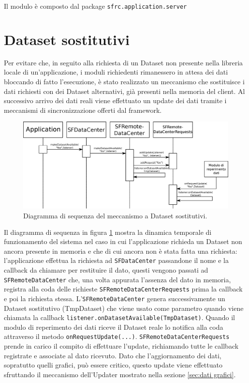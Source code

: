 Il modulo \`e composto dal package \texttt{sfrc.application.server}

\section{Dataset sostitutivi}
\label{sec:dataset_sost}
Per evitare che, in seguito alla richiesta di un Dataset non presente nella libreria locale di un'applicazione, i moduli richiedenti rimanessero in attesa dei dati bloccando di fatto l'esecuzione, \`e stato realizzato un meccanismo che sostituisce i dati richiesti con dei Dataset alternativi, gi\`a presenti nella memoria del client. Al successivo arrivo dei dati reali viene effettuato un update dei dati tramite i meccanismi di sincronizzazione offerti dal framework.

\begin{figure}
\begin{center}
\includegraphics[width=\textwidth]{Immagini/sequenzaDatiSost}
\caption{Diagramma di sequenza del meccanismo a Dataset sostitutivi.\label{f:seqsost}} 
\end{center} 
\end{figure}

Il diagramma di sequenza in figura \ref{f:seqsost} mostra la dinamica temporale di funzionamento del sistema nel caso in cui l'applicazione richieda un Dataset non ancora presente in memoria e che di cui ancora non \`e stata fatta una richiesta: l'applicazione effettua la richiesta ad \texttt{SFDataCenter} passandone il nome e la callback da chiamare per restituire il dato, questi vengono passati ad \texttt{SFRemoteDataCenter} che, una volta appurata l'assenza del dato in memoria, registra alla coda delle richieste \texttt{SFRemoteDataCenterRequests} prima la callback e poi la richiesta stessa. L'\texttt{SFRemoteDataCenter} genera successivamente un Dataset sostitutivo (TmpDataset) che viene usato come parametro quando viene chiamata la callback \texttt{listener.onDatasetAvailable(TmpDataset)}.
Quando il modulo di reperimento dei dati riceve il Dataset reale lo notifica alla coda attraverso il metodo \texttt{onRequestUpdate(...)}. \texttt{SFRemoteDataCenterRequests} prende in carico il compito di effettuare l'update, richiamando tutte le callback registrate e associate al dato ricevuto.
Dato che l'aggiornamento dei dati, sopratutto quelli grafici, pu\`o essere critico, questo update viene effettuato sfruttando il meccanismo dell'Updater mostrato nella sezione \ref{sec:dati grafici}.

